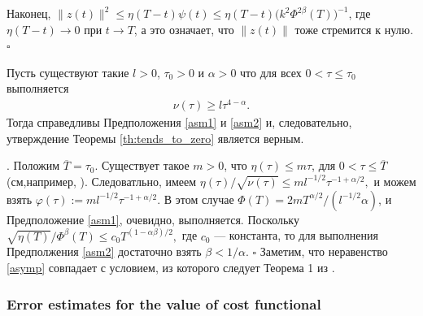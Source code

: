 \documentclass[../main.tex]{subfiles}
\begin{document}
Наконец, $ \|z(t)\|^2 \leqslant \eta(T-t)\psi(t) \leqslant \eta(T-t)\big(k^2\Phi^{2\beta}(T)\big)^{-1} $, 
где $\eta(T-t) \to 0$ при $t \to T$, а это означает, что $\|z(t)\|$ тоже стремится к нулю.
	\hfill $ \square $
\begin{corollary}%
Пусть существуют такие $ l > 0$, $\tau_0 > 0$ и $\alpha > 0$ что для всех $0 < \tau \leqslant \tau_0 $ выполняется
		\begin{gather}\label{asymp}
			\nu(\tau)\geqslant l\tau^{4-\alpha}.
		\end{gather}
 Тогда справедливы Предположения \ref{asm1} и \ref{asm2} и, следовательно, утверждение Теоремы \ref{th:tends_to_zero} является верным.
\end{corollary}
\doc. 
Положим $\overline{T}=\tau_0$. 
Существует такое $m>0$, что $\eta(\tau)\leqslant m \tau$,  для $0 < \tau \leqslant\overline{T}$ (см,например, \cite{GusevOsipov}). 
Следоватльно, имеем $
\eta(\tau)/\sqrt{\nu(\tau)} \leqslant  
	 ml^{-1/2}\tau^{-1+\alpha/2},$
и можем взять  $\varphi(\tau):=  
	 ml^{-1/2}\tau^{-1+\alpha/2}$. 
В этом случае 
$\Phi(T)=2mT^{\alpha/2}/(l^{-1/2}\alpha)$, и Предположение \ref{asm1}, очевидно, выполняется. 
Поскольку 
$\sqrt{\eta(T)}/\Phi^\beta(T) \leqslant c_0T^{(1-\alpha\beta)/2},$
где $c_0$ --- константа, то для выполнения Предполжения  \ref{asm2} достаточно взять $\beta < 1/\alpha$.
	\hfill $ \square $
Заметим, что неравенство \eqref{asymp} совпадает с условием, из которого следует Теорема 1 из \cite{GusevOsipov}.

\subsubsection{Error estimates for the value of cost functional}
\end{document}
